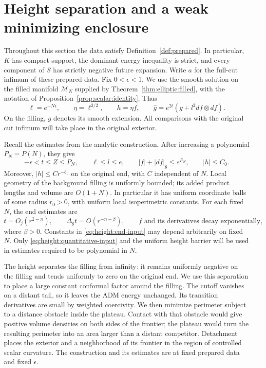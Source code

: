 \section{Height separation and a weak minimizing enclosure}
\label{sec:height}

Throughout this section the data satisfy Definition~\ref{def:prepared}.  In particular, $K$ has compact
support, the dominant energy inequality is strict, and every component of
$S$ has strictly negative future expansion.  Write $a$ for the full-cut
infimum of these prepared data.  Fix $0<\epsilon<1$.  We use the smooth
solution on the filled manifold $\mathcal M_N$ supplied by
Theorem~\ref{thm:elliptic:filled}, with the notation of
Proposition~\ref{prop:scalar:identity}.  Thus
\begin{equation}\label{eq:height:parameters}
 \ell=e^{-N\epsilon},\qquad \eta=\ell^{3/2},\qquad h=\eta f,
 \qquad \widehat g=e^{2t}(g+l^2df\otimes df).
\end{equation}
On the filling, $g$ denotes its smooth extension.  All comparisons with
the original cut infimum will take place in the original exterior.

Recall the estimates from the analytic construction.  After increasing
a polynomial $P_N=P(N)$, they give
\begin{equation}\label{eq:height:quantitative-input}
 -\epsilon<t\le Z\le P_N,\qquad
 \ell\le l\le e,\qquad
 |f|+|df|_g\le e^{P_N},\qquad |h|\le C_0.
\end{equation}
Moreover, $|h|\le Cr^{-b_1}$ on the original end, with $C$ independent
of $N$.  Local geometry of the background filling is uniformly bounded;
its added product lengths and volume are $O(1+N)$.  In particular it has
uniform coordinate balls of some radius $r_0>0$, with uniform local
isoperimetric constants.  For each fixed $N$, the end estimates are
\begin{equation}\label{eq:height:end-input}
 t=O_j(r^{2-n}),\qquad \Delta_g t=O(r^{-n-\beta}),
 \qquad f\text{ and its derivatives decay exponentially},
\end{equation}
where $\beta>0$.  Constants in \eqref{eq:height:end-input}
may depend arbitrarily on fixed $N$.  Only
\eqref{eq:height:quantitative-input} and the uniform height
barrier will be used in estimates required to be polynomial in $N$.

The height separates the filling from infinity: it remains uniformly
negative on the filling and tends uniformly to zero on the original
end. We use this separation to place a large constant conformal
factor around the filling. The cutoff vanishes on a distant tail,
so it leaves the ADM energy unchanged. Its transition derivatives
are small by weighted coercivity. We then minimize perimeter subject
to a distance obstacle inside the plateau. Contact with that obstacle
would give positive volume densities on both sides of the frontier;
the plateau would turn the resulting perimeter into an area larger
than a distant competitor. Detachment places the exterior and a
neighborhood of its frontier in the region of controlled scalar
curvature. The construction and its estimates are at fixed prepared
data and fixed $\epsilon$.

